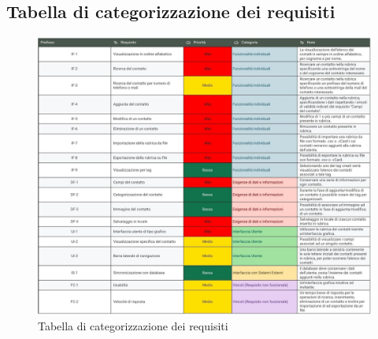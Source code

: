 \subsection{Tabella di categorizzazione dei requisiti}
\begin{figure}[h]
	\centering
	\includegraphics[width=\textwidth]{images/Categorizzazione requisiti.jpg}
	\caption{Tabella di categorizzazione dei requisiti}
	\label{categorizzazione_dei_requisiti}	
\end{figure}

\newpage
